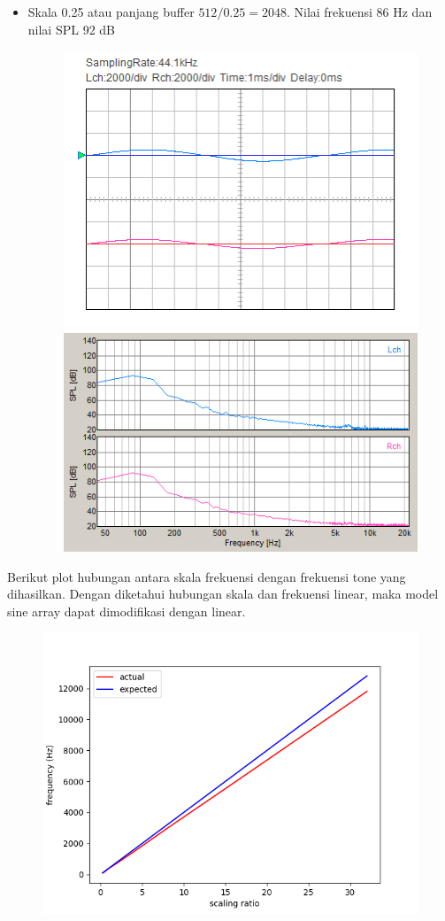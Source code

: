 \documentclass[12pt,]{article}
\begin{document}
\begin{itemize}
  		\newpage
  		\item Skala 0.25 atau panjang buffer $512/0.25 = 2048$.
  		Nilai frekuensi 86 Hz dan nilai SPL 92 dB
  		\begin{figure}[H]
  			\centering
  			\includegraphics[width=0.45\linewidth]{result/day_4/osi_sine0p25}
  			\includegraphics[width=0.45\linewidth]{result/day_4/fft_sine0p25}
  		\end{figure}
  	\end{itemize}
	
	Berikut plot hubungan antara skala frekuensi dengan frekuensi tone yang dihasilkan.
	Dengan diketahui hubungan skala dan frekuensi linear, maka model sine array dapat dimodifikasi dengan linear.
	\begin{figure}[H]
		\centering
		\includegraphics[width=0.45\linewidth]{result/analisa/freq_scaling}
	\end{figure}
\end{document}
